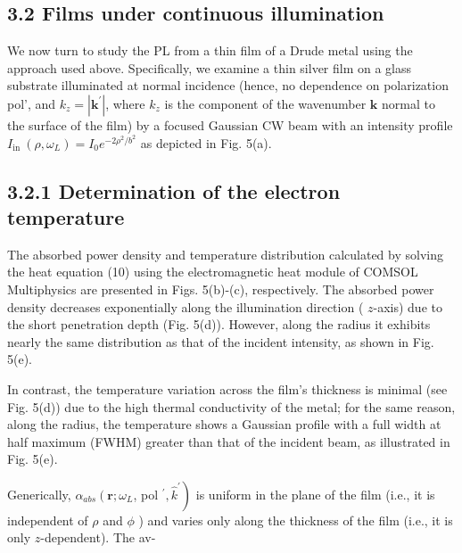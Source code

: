 \documentclass[10pt]{article}
\begin{document}
\subsection*{3.2 Films under continuous illumination}
We now turn to study the PL from a thin film of a Drude metal using the approach used above. Specifically, we examine a thin silver film on a glass substrate illuminated at normal incidence (hence, no dependence on polarization pol', and $k_{z}=\left|\mathbf{k}^{\prime}\right|$, where $k_{z}$ is the component of the wavenumber $\mathbf{k}$ normal to the surface of the film) by a focused Gaussian CW beam with an intensity profile $I_{\text {in }}\left(\rho, \omega_{L}\right)=I_{0} e^{-2 \rho^{2} / b^{2}}$ as depicted in Fig. 5(a).

\subsection*{3.2.1 Determination of the electron temperature}
The absorbed power density and temperature distribution calculated by solving the heat equation (10) using the electromagnetic heat module of COMSOL Multiphysics are presented in Figs. 5(b)-(c), respectively. The absorbed power density decreases exponentially along the illumination direction ( $z$-axis) due to the short penetration depth (Fig. 5(d)). However, along the radius it exhibits nearly the same distribution as that of the incident intensity, as shown in Fig. 5(e).

In contrast, the temperature variation across the film's thickness is minimal (see Fig. 5(d)) due to the high thermal conductivity of the metal; for the same reason, along the radius, the temperature shows a Gaussian profile with a full width at half maximum (FWHM) greater than that of the incident beam, as illustrated in Fig. 5(e).

Generically, $\alpha_{a b s}\left(\mathbf{r} ; \omega_{L}\right.$, pol $\left.^{\prime}, \hat{k}^{\prime}\right)$ is uniform in the plane of the film (i.e., it is independent of $\rho$ and $\phi$ ) and varies only along the thickness of the film (i.e., it is only $z$-dependent). The av-
\end{document}
